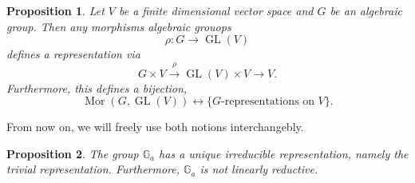 \documentclass[10pt]{article}
\newtheorem{proposition}{Proposition}[section]
\numberwithin{equation}{theorem}
\DeclareMathOperator{\Mor}{Mor}
\DeclareMathOperator{\GL}{GL}
\newcommand{\G}[0]{\mathbb{G}}
\begin{document}
\begin{proposition}
  Let $V$ be a finite dimensional vector space and $G$ be an algebraic group. Then any morphisms algebraic grouops 
  \begin{equation*}
    \rho:G\to\GL(V)
  \end{equation*}
  defines a representation via 
  \begin{equation*}
    G\times V\stackrel{\rho}{\to}\GL(V)\times V\to V.
  \end{equation*}
  Furthermore, this defines a bijection,
  \begin{equation*}
    \Mor(G,\GL(V))\leftrightarrow \{\text {$G$-representations on $V$}\}.
  \end{equation*}
\end{proposition}
From now on, we will freely use both notions interchangebly.
\begin{proposition}
  The group $\G_a$ has a unique irreducible representation, namely the trivial representation. Furthermore, $\G_a$ is not linearly reductive.
\end{proposition}
\end{document}
